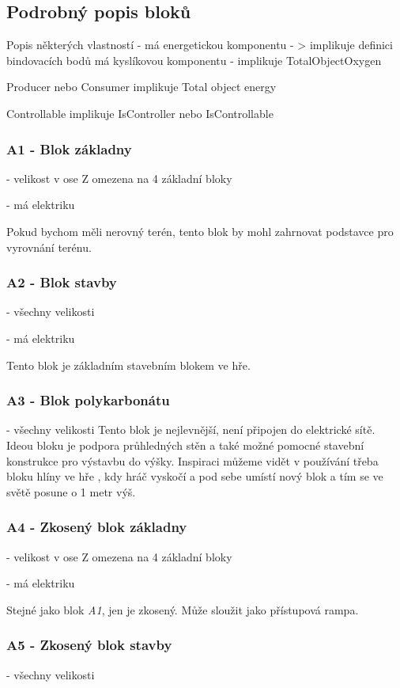 \subsection{Podrobný popis bloků}

Popis některých vlastností - má energetickou komponentu - > implikuje definici bindovacích bodů
má kyslíkovou komponentu - implikuje TotalObjectOxygen

Producer nebo Consumer implikuje Total object energy

Controllable implikuje IsController nebo IsControllable



\subsubsection{A1 - Blok základny}
- velikost v ose Z omezena na 4 základní bloky

- má elektriku

Pokud bychom měli nerovný terén, tento blok by mohl zahrnovat podstavce pro vyrovnání terénu.

\subsubsection{A2 - Blok stavby}
- všechny velikosti

- má elektriku

Tento blok je základním stavebním blokem ve hře.

\subsubsection{A3 - Blok polykarbonátu}
- všechny velikosti
Tento blok je nejlevnější, není připojen do elektrické sítě. Ideou bloku je podpora průhledných stěn a také možné pomocné stavební konstrukce pro výstavbu do výšky. Inspiraci můžeme vidět v používání třeba bloku hlíny ve hře \MC{}, kdy hráč vyskočí a pod sebe umístí nový blok a tím se ve světě posune o 1 metr výš.

\subsubsection{A4 - Zkosený blok základny}
- velikost v ose Z omezena na 4 základní bloky

- má elektriku

Stejné jako blok \textit{A1}, jen je zkosený. Může sloužit jako přístupová rampa.

\subsubsection{A5 - Zkosený blok stavby}
- všechny velikosti


